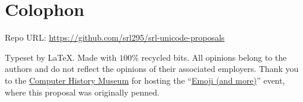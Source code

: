 \documentclass[12pt]{article}
\begin{document}

{}
\printbibliography
\section*{Colophon}

Repo URL: \small\url{https://github.com/srl295/srl-unicode-proposals} 


Typeset by \LaTeX . Made with \( 100\%  \) recycled bits. All opinions belong to the authors and do not reflect the opinions
of their associated employers. Thank you to the \href{http://www.computerhistory.org}{Computer History Museum} 
for hosting the ``\href{https://www.facebook.com/events/1727012724179335/}{Emoji (and more)}'' event, where this proposal was originally penned. 
\end{document}
